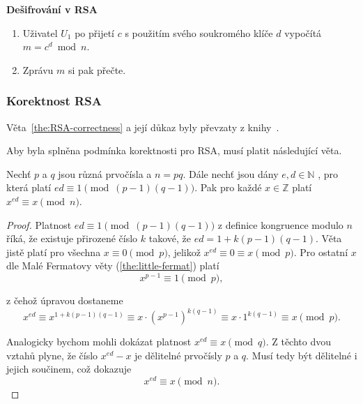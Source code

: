 \documentclass[
  program=infoi,
  biblatex=false,
  figures=true,
  glossaries,
  tables=false,
  sourcecodes=true,
  index
]{kidiplom}
\begin{document}
        \bigskip
        \noindent
        \textbf{Dešifrování v RSA}
            \begin{enumerate}
                \item 
                    Uživatel $U_1$ po přijetí $c$ s použitím svého soukromého klíče $d$ vypočítá $m = c^d \bmod{n}$.
                \item    
                    Zprávu $m$ si pak přečte.
            \end{enumerate}
        
            
    \subsubsection{Korektnost RSA}

        Věta~\ref{the:RSA-correctness} a její důkaz byly převzaty z knihy~\cite{handbook}.

        Aby byla splněna podmínka korektnosti pro RSA, musí platit následující věta.

        \begin{theorem}\label{the:RSA-correctness}
            Nechť $p$ a $q$ jsou různá prvočísla a $n = pq$.
            Dále nechť jsou dány $e, d \in \mathbb{N}$ , pro která platí $ed \equiv 1 \pmod{(p - 1)(q - 1)}$.
            Pak pro každé $x \in \mathbb{Z}$ platí $x^{ed} \equiv x \pmod{n}$.
        \end{theorem}

        \begin{proof}
            Platnost $ed \equiv 1 \pmod{(p - 1)(q - 1)}$ z definice kongruence modulo $n$ říká, že existuje
            přirozené číslo $k$ takové, že $ed = 1 + k(p - 1)(q - 1)$.
            Věta jistě platí pro všechna $x \equiv 0 \pmod{p}$, jelikož $x^{ed} \equiv 0 \equiv x \pmod{p}$.
            Pro ostatní $x$ dle Malé Fermatovy věty (\ref{the:little-fermat}) platí
            \[
                x^{p-1} \equiv 1 \pmod{p},
            \]
            
            \noindent
            z čehož úpravou dostaneme
            \[
                x^{ed} \equiv x^{1 + k(p - 1)(q - 1)} \equiv x \cdot (x^{p-1})^{k(q-1)} \equiv x \cdot 1^{k(q-1)} \equiv x \pmod{p}.
            \]

            \noindent
            Analogicky bychom mohli dokázat platnost $x^{ed} \equiv x \pmod{q}$.
            Z těchto dvou vztahů plyne, že číslo $x^{ed}-x$ je dělitelné prvočísly $p$ a $q$.
            Musí tedy být dělitelné i jejich součinem, což dokazuje
            \[
                x^{ed} \equiv x \pmod{n}.
            \]
        \end{proof}
\end{document}
